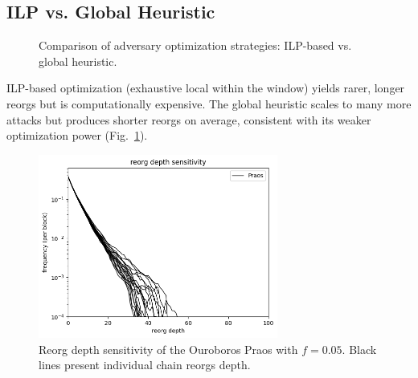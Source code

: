 \subsection{ILP vs. Global Heuristic}
\begin{figure}[htbp!]
\caption{Comparison of adversary optimization strategies: ILP-based vs. global heuristic.}
\label{fig:optimization}
\end{figure}

ILP-based optimization (exhaustive local within the window) yields rarer, longer reorgs but is computationally expensive. The global heuristic scales to many more attacks but produces shorter reorgs on average, consistent with its weaker optimization power (Fig.~\ref{fig:optimization}).


\begin{figure}[htbp!]
\includegraphics[width=0.7\textwidth]{figs/Praos.png}
\caption{Reorg depth sensitivity of the Ouroboros Praos with $f=0.05$. Black lines present individual chain reorgs depth.}
\label{fig:praos}
\end{figure}

